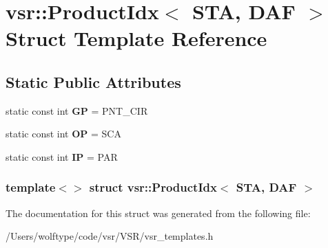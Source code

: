 \hypertarget{structvsr_1_1_product_idx_3_01_s_t_a_00_01_d_a_f_01_4}{\section{vsr\-:\-:Product\-Idx$<$ S\-T\-A, D\-A\-F $>$ Struct Template Reference}
\label{structvsr_1_1_product_idx_3_01_s_t_a_00_01_d_a_f_01_4}
}
\subsection*{Static Public Attributes}
\begin{DoxyCompactItemize}
\item 
\hypertarget{structvsr_1_1_product_idx_3_01_s_t_a_00_01_d_a_f_01_4_a50e94b8bfdd01424287947735ab45924}{static const int {\bfseries G\-P} = P\-N\-T\-\_\-\-C\-I\-R}\label{structvsr_1_1_product_idx_3_01_s_t_a_00_01_d_a_f_01_4_a50e94b8bfdd01424287947735ab45924}

\item 
\hypertarget{structvsr_1_1_product_idx_3_01_s_t_a_00_01_d_a_f_01_4_a2a7500163b4dc69f20ed1eada0ad3ace}{static const int {\bfseries O\-P} = S\-C\-A}\label{structvsr_1_1_product_idx_3_01_s_t_a_00_01_d_a_f_01_4_a2a7500163b4dc69f20ed1eada0ad3ace}

\item 
\hypertarget{structvsr_1_1_product_idx_3_01_s_t_a_00_01_d_a_f_01_4_a0616e9f2ae610c28f706b943cde32615}{static const int {\bfseries I\-P} = P\-A\-R}\label{structvsr_1_1_product_idx_3_01_s_t_a_00_01_d_a_f_01_4_a0616e9f2ae610c28f706b943cde32615}

\end{DoxyCompactItemize}
\subsubsection*{template$<$$>$ struct vsr\-::\-Product\-Idx$<$ S\-T\-A, D\-A\-F $>$}



The documentation for this struct was generated from the following file\-:\begin{DoxyCompactItemize}
\item 
/\-Users/wolftype/code/vsr/\-V\-S\-R/vsr\-\_\-templates.\-h\end{DoxyCompactItemize}
